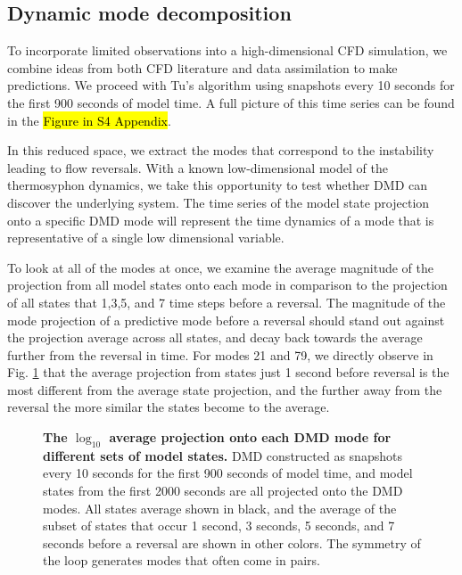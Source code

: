 \documentclass[10pt,letterpaper]{article}
\begin{document}
\subsection*{Dynamic mode decomposition}
\label{dmd_section}

To incorporate limited observations into a high-dimensional CFD simulation, we combine ideas from both CFD literature and data assimilation to make predictions.
We proceed with Tu's algorithm using snapshots every 10 seconds for the first 900 seconds of model time.
A full picture of this time series can be found in the \hl{Figure in S4 Appendix}.

In this reduced space, we extract the modes that correspond to the instability leading to flow reversals.
With a known low-dimensional model of the thermosyphon dynamics, we take this opportunity to test whether DMD can discover the underlying system.
The time series of the model state projection onto a specific DMD mode will represent the time dynamics of a mode that is representative of a single low dimensional variable.

To look at all of the modes at once, we examine the average magnitude of the projection from all model states onto each mode in comparison to the projection of all states that 1,3,5, and 7 time steps before a reversal.
The magnitude of the mode projection of a predictive mode before a reversal should stand out against the projection average across all states, and decay back towards the average further from the reversal in time.
For modes 21 and 79, we directly observe in Fig. \ref{fig:DMD_modes} that the average projection from states just 1 second before reversal is the most different from the average state projection, and the further away from the reversal the more similar the states become to the average.

\begin{figure}[h]
  \centering
  \caption[]{
\textbf{    The $\log_{10}$ average projection onto each DMD mode for different sets of model states.
}    DMD constructed as snapshots every 10 seconds for the first 900 seconds of model time, and model states from the first 2000 seconds are all projected onto the DMD modes.
    All states average shown in black, and the average of the subset of states that occur 1 second, 3 seconds, 5 seconds, and 7 seconds before a reversal are shown in other colors.
    The symmetry of the loop generates modes that often come in pairs.
      }
  \label{fig:DMD_modes}
\end{figure}
\end{document}
